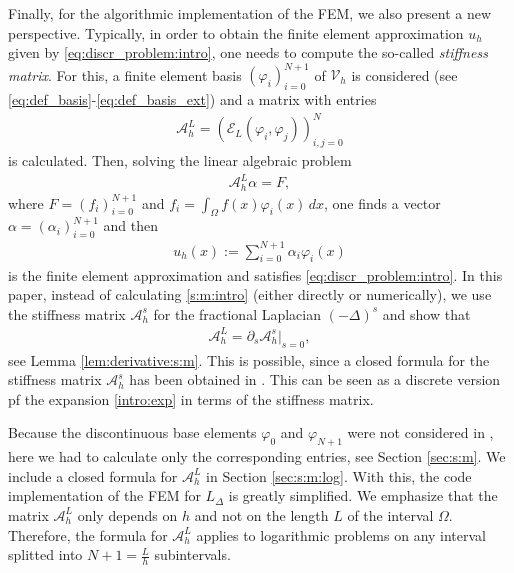 \documentclass[10 pt]{article}
\numberwithin{equation}{section}
\def\cE{\mathcal{E}}
\begin{document}
 Finally, for the algorithmic implementation of the FEM, we also present a new perspective. Typically, in order to obtain the finite element approximation $u_h$ given by \eqref{eq:discr_problem:intro}, one needs to compute the so-called \emph{stiffness matrix}. For this, a finite element basis $(\varphi_i)_{i=0}^{N+1}$ of $\mathcal V_h$ is considered (see \eqref{eq:def_basis}-\eqref{eq:def_basis_ext}) and a matrix with entries
 \begin{align}\label{s:m:intro}
 \mathcal A_{h}^{L}=(\cE_L(\varphi_i,\varphi_j))_{i,j=0}^N
 \end{align}
 is calculated. Then, solving the linear algebraic problem
 \begin{align*}
\mathcal A_{h}^{L}\alpha = F,
 \end{align*}
 where $F=(f_i)_{i=0}^{N+1}$ and $f_i=\int_{\Omega}f(x)\varphi_i(x)\, dx$, one finds a vector $\alpha=(\alpha_i)_{i=0}^{N+1}$ and then
 \begin{align*}
     u_h(x):=\sum_{i=0}^{N+1}\alpha_i \varphi_i(x)
 \end{align*}
 is the finite element approximation and satisfies \eqref{eq:discr_problem:intro}. In this paper, instead of calculating \eqref{s:m:intro} (either directly or numerically), we use the stiffness matrix $\mathcal A_{h}^{s}$ for the fractional Laplacian $(-\Delta)^s$ and show that
 \begin{align*}
 \mathcal A_{h}^{L}=\partial_s \mathcal A_{h}^{s}|_{s=0},
 \end{align*}
 see Lemma \ref{lem:derivative:s:m}.  This is possible, since a closed formula for the stiffness matrix $\mathcal A_{h}^{s}$ has been obtained in \cite{BH17}.  This can be seen as a discrete version pf the expansion \eqref{intro:exp} in terms of the stiffness matrix. 
 
 Because the discontinuous base elements $\varphi_0$ and $\varphi_{N+1}$ were not considered in \cite{BH17}, here we had to calculate only the corresponding entries, see Section \ref{sec:s:m}.  We include a closed formula for $\mathcal A_{h}^{L}$ in Section \ref{sec:s:m:log}.  With this, the code implementation of the FEM for $L_\Delta$ is greatly simplified. We emphasize that the matrix $\mathcal A_{h}^{L}$ only depends on $h$ and not on the length $L$ of the interval $\Omega$.  Therefore, the formula for $\mathcal A_{h}^{L}$ applies to logarithmic problems on any interval splitted into $N+1=\frac{L}{h}$ subintervals.
\end{document}
